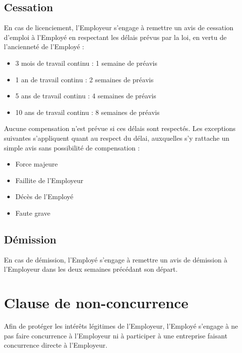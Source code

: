 \documentclass{article}
\begin{document}
    	\subsection{Cessation}
	    En cas de licenciement, l'Employeur s'engage à remettre un avis de cessation d'emploi à l'Employé en respectant les délais prévus par la loi, en vertu de l'ancienneté de l'Employé :
	    
	    \begin{itemize}
	    	\item 3 mois de travail continu : 1 semaine de préavis
	    	\item 1 an de travail continu : 2 semaines de préavis
	    	\item 5 ans de travail continu : 4 semaines de préavis
	    	\item 10 ans de travail continu : 8 semaines de préavis
	    \end{itemize}
	    
	    Aucune compensation n'est prévue si ces délais sont respectés. Les exceptions suivantes s'appliquent quant au respect du délai, auxquelles s'y rattache un simple avis sans possibilité de compensation : %
	    \begin{multicols}{2}
		    \begin{itemize}
		    	\item Force majeure
		    	\item Faillite de l'Employeur
		    	\item Décès de l'Employé
		    	\item Faute grave
		    \end{itemize}
		\end{multicols}
			    	
    	\subsection{Démission}
	    En cas de démission, l'Employé s'engage à remettre un avis de démission à l'Employeur dans les deux semaines précédant son départ.
    
    	\section{Clause de non-concurrence}
    	Afin de protéger les intérêts légitimes de l'Employeur, l'Employé s'engage  à ne pas faire concurrence à l'Employeur ni à participer à une entreprise faisant concurrence directe à l'Employeur.
    	
\end{document}
